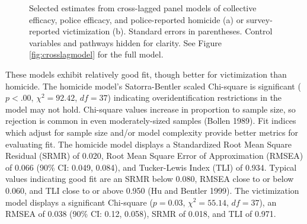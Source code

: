 \documentclass [11pt, proquest] {uwthesis}[2015/03/03]
\begin{document}
\begin{figure}

{\centering {}

}

\caption[Selected estimates from cross-lagged panel models of collective efficacy, police efficacy, and police-reported homicide or survey-reported victimization.]{Selected estimates from cross-lagged panel models of collective efficacy, police efficacy, and police-reported homicide (a) or survey-reported victimization (b). Standard errors in parentheses. Control variables and pathways hidden for clarity. See Figure \ref{fig:crosslagmodel} for the full model.}\label{fig:crosslagresults}
\end{figure}
These models exhibit relatively good fit, though better for victimization than homicide. The homicide model's Satorra-Bentler scaled Chi-square is significant (\(p <.00\), \(\chi^{2} = 92.42\), \(df = 37\)) indicating overidentification restrictions in the model may not hold. Chi-square values increase in proportion to sample size, so rejection is common in even moderately-sized samples (Bollen 1989). Fit indices which adjust for sample size and/or model complexity provide better metrics for evaluating fit. The homicide model displays a Standardized Root Mean Square Residual (SRMR) of 0.020, Root Mean Square Error of Approximation (RMSEA) of 0.066 (90\% CI: 0.049, 0.084), and Tucker-Lewis Index (TLI) of 0.934. Typical values indicating good fit are an SRMR below 0.080, RMSEA close to or below 0.060, and TLI close to or above 0.950 (Hu and Bentler 1999). The victimization model displays a significant Chi-square (\(p = 0.03\), \(\chi^{2} = 55.14\), \(df = 37\)), an RMSEA of 0.038 (90\% CI: 0.12, 0.058), SRMR of 0.018, and TLI of 0.971.
\end{document}
